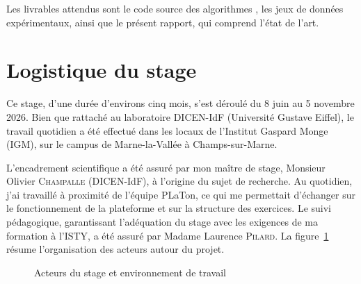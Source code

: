 \documentclass[12pt,a4paper,oneside]{report}
\begin{document}
\vspace{0.6cm}

Les livrables attendus sont le code source des algorithmes , les jeux de
 données expérimentaux, ainsi que le présent rapport, qui comprend l'état de l'art.
\clearpage




\section{Logistique du  stage}


Ce stage, d'une durée d'environs cinq mois, s'est déroulé du 8 juin au 5 novembre
2026. Bien que rattaché au laboratoire DICEN-IdF (Université Gustave
Eiffel), le travail quotidien a été effectué dans les locaux de l'Institut
Gaspard Monge (IGM), sur le campus de Marne-la-Vallée à Champs-sur-Marne.

L'encadrement scientifique a été assuré par mon maître de stage, Monsieur
Olivier \textsc{Champalle} (DICEN-IdF), à l'origine du sujet de recherche.
Au quotidien, j'ai travaillé à proximité de l'équipe PLaTon, ce qui me
permettait d'échanger sur le fonctionnement de la plateforme et sur la
structure des exercices. Le suivi pédagogique, garantissant l'adéquation
du stage avec les exigences de ma formation à l'ISTY, a été assuré par
Madame Laurence \textsc{Pilard}. La figure~\ref{fig:acteurs} résume
l'organisation des acteurs autour du projet.


\begin{figure}[H]
    \centering
    \caption{Acteurs du stage et environnement de travail}
    \label{fig:acteurs}
\end{figure}
\end{document}
